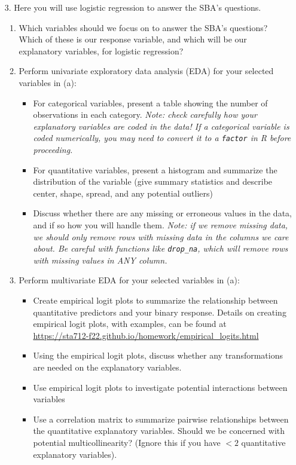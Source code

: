 \documentclass[11pt]{article}
\begin{document}
\begin{enumerate}
\item[3.] Here you will use logistic regression to answer the SBA's questions.

\begin{enumerate}
\item Which variables should we focus on to answer the SBA's questions? Which of these is our response variable, and which will be our explanatory variables, for logistic regression?

\item Perform univariate exploratory data analysis (EDA) for your selected variables in (a): 
\begin{itemize}
\item For categorical variables, present a table showing the number of observations in each category. \textit{Note: check carefully how your explanatory variables are coded in the data! If a categorical variable is coded numerically, you may need to convert it to a \emph{\texttt{factor}} in R before proceeding.}
\item For quantitative variables, present a histogram and summarize the distribution of the variable (give summary statistics and describe center, shape, spread, and any potential outliers)
\item Discuss whether there are any missing or erroneous values in the data, and if so how you will handle them. \textit{Note: if we remove missing data, we should only remove rows with missing data in the columns we care about. Be careful with functions like \emph{\texttt{drop\_na}}, which will remove rows with missing values in ANY column.} 
\end{itemize}
\item Perform multivariate EDA for your selected variables in (a):
\begin{itemize}
\item Create empirical logit plots to summarize the relationship between quantitative predictors and your binary response. Details on creating empirical logit plots, with examples, can be found at\\ \url{https://sta712-f22.github.io/homework/empirical_logits.html}
\item Using the empirical logit plots, discuss whether any transformations are needed on the explanatory variables.
\item Use empirical logit plots to investigate potential interactions between variables
\item Use a correlation matrix to summarize pairwise relationships between the quantitative explanatory variables. Should we be concerned with potential multicollinearity? (Ignore this if you have $< 2$ quantitative explanatory variables).

\end{itemize}
\end{enumerate}
\end{enumerate}
\end{document}
